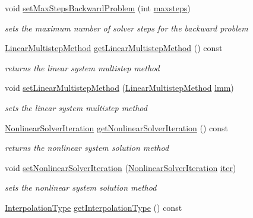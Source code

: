 \begin{DoxyCompactItemize}
void \mbox{\hyperlink{classamici_1_1_solver_aa1d39cd744f489c17c3497c98acb7f59}{set\+Max\+Steps\+Backward\+Problem}} (int \mbox{\hyperlink{classamici_1_1_solver_a029415ebe024ac6281fd9f190aefb2ee}{maxsteps}})
\begin{DoxyCompactList}\small\item\em sets the maximum number of solver steps for the backward problem \end{DoxyCompactList}\item 
\mbox{\hyperlink{namespaceamici_a9ebe272482a8e073efe7078b7e96e8bc}{Linear\+Multistep\+Method}} \mbox{\hyperlink{classamici_1_1_solver_a60631d9a18e29c1102cae7cb77b9918c}{get\+Linear\+Multistep\+Method}} () const
\begin{DoxyCompactList}\small\item\em returns the linear system multistep method \end{DoxyCompactList}\item 
void \mbox{\hyperlink{classamici_1_1_solver_a2143a6f85b81c24611aad5689865953c}{set\+Linear\+Multistep\+Method}} (\mbox{\hyperlink{namespaceamici_a9ebe272482a8e073efe7078b7e96e8bc}{Linear\+Multistep\+Method}} \mbox{\hyperlink{classamici_1_1_solver_af71d1353291520f9ba68df79c4b9f053}{lmm}})
\begin{DoxyCompactList}\small\item\em sets the linear system multistep method \end{DoxyCompactList}\item 
\mbox{\hyperlink{namespaceamici_a13388d34e4c35bb592c3e821c35cc923}{Nonlinear\+Solver\+Iteration}} \mbox{\hyperlink{classamici_1_1_solver_a33883905a8ab056896373d76f18ce683}{get\+Nonlinear\+Solver\+Iteration}} () const
\begin{DoxyCompactList}\small\item\em returns the nonlinear system solution method \end{DoxyCompactList}\item 
void \mbox{\hyperlink{classamici_1_1_solver_a1dc7983f545ee95f7e6fb38cfb0b3286}{set\+Nonlinear\+Solver\+Iteration}} (\mbox{\hyperlink{namespaceamici_a13388d34e4c35bb592c3e821c35cc923}{Nonlinear\+Solver\+Iteration}} \mbox{\hyperlink{classamici_1_1_solver_a0ef59d3f746d2ec0e3f126b7b9989f50}{iter}})
\begin{DoxyCompactList}\small\item\em sets the nonlinear system solution method \end{DoxyCompactList}\item 
\mbox{\hyperlink{namespaceamici_a8472f01c511d77bbfb981a46618ea1ea}{Interpolation\+Type}} \mbox{\hyperlink{classamici_1_1_solver_a69568ccb5de1bcdd4344e105ddb12324}{get\+Interpolation\+Type}} () const

\end{DoxyCompactItemize}
